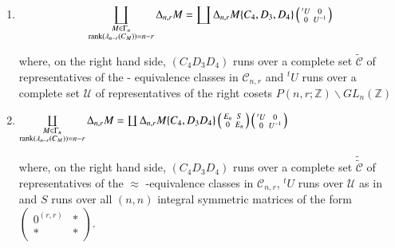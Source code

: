 \begin{sublemma}\label{c1:lem-1.6.15}
\begin{enumerate}
\renewcommand{\theenumi}{\roman{enumi}}
\renewcommand{\labelenumi}{\rm(\theenumi)}
\item $$\coprod\limits_{\substack{M\in\Gamma_{n}\\ \operatorname{rank}
    (\lambda_{n-r}(C_{M}))=n-r}}\Delta_{n,r}M=\coprod
  \Delta_{n,r}M\{C_{4},D_{3},D_{4}\}\left(\begin{smallmatrix} {}^{t}U
    & 0\\ 0 & U^{-1}  \end{smallmatrix}\right)$$

where, on the right hand side, $(C_{4}D_{3}D_{4})$ runs over a
complete set $\tilde{\mathscr{C}}$ of representatives of the -
equivalence classes in $\mathscr{C}_{n,r}$ and ${}^{t}U$ runs over a
complete set $\mathscr{U}$ of representatives of the right cosets
$P(n,r;\mathbb{Z})\backslash GL_{n}(\mathbb{Z})$

\item $\coprod\limits_{\substack{M\in\Gamma_{n}\\ \operatorname{rank}
    (\lambda_{n-r}(C_{M}))=n-r}} \Delta_{n,r}M=\coprod
  \Delta_{n,r}M\{C_{4},D_{3}D_{4}\}\left(\begin{smallmatrix} E_{n} &
    S\\ 0 & E_{n}  \end{smallmatrix}\right)\left(\begin{smallmatrix}
    {}^{t}U & 0\\ 0 & U^{-1}  \end{smallmatrix}\right)$

where, on the right hand side, $(C_{4}D_{3}D_{4})$ runs over a
complete set $\tilde{\tilde{\mathscr{C}}}$ of representatives
of the $\approx$ -equivalence classes in $\mathscr{C}_{n,r}$,
${}^{t}U$ runs over $\mathscr{U}$ as in and $S$
runs over all $(n,n)$ integral symmetric matrices of the form
$\left(\begin{smallmatrix} 0^{(r,r)} & \ast\\ \ast & \ast
\end{smallmatrix}\right)$. 
\end{enumerate}
\end{sublemma}

